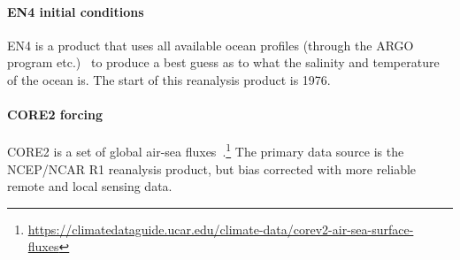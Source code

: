 \paragraph{EN4 initial conditions}
EN4 is a product that uses all available ocean profiles
(through the ARGO program etc.)~\cite{good2013en4, HadObs}
to produce a best guess as to what the salinity and temperature of the ocean is.
 The start of this reanalysis product is 1976.


\paragraph{CORE2 forcing}
CORE2 is a set of global air-sea fluxes~\cite{griffies2012datasets,large2009global,
 hurrell2008new, core2, core2expert}.\footnote{\url{https://climatedataguide.ucar.edu/climate-data/corev2-air-sea-surface-fluxes}}
 The primary data source is the NCEP/NCAR R1 reanalysis product, but bias corrected
 with more reliable remote and local sensing data.


